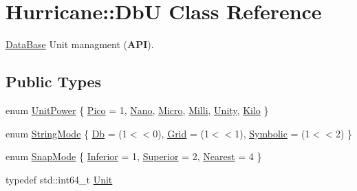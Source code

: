 \hypertarget{classHurricane_1_1DbU}{}\section{Hurricane\+:\+:DbU Class Reference}
\label{classHurricane_1_1DbU}


\hyperlink{classHurricane_1_1DataBase}{Data\+Base} Unit managment ({\bfseries A\+PI}).  


\subsection*{Public Types}
\begin{DoxyCompactItemize}
\item 
enum \hyperlink{group__DbUGroup_ga50b5785bf4d75026c4c112caec3040a7}{Unit\+Power} \{ \newline
\hyperlink{group__DbUGroup_gga50b5785bf4d75026c4c112caec3040a7a3cf34ad82faf73a9b48dcb3a621d0557}{Pico} = 1, 
\newline
\hyperlink{group__DbUGroup_gga50b5785bf4d75026c4c112caec3040a7a03e5923be5810db830626f2ca26319d6}{Nano}, 
\newline
\hyperlink{group__DbUGroup_gga50b5785bf4d75026c4c112caec3040a7aa0481a3398a6cbb0a68a523146f0a7fb}{Micro}, 
\newline
\hyperlink{group__DbUGroup_gga50b5785bf4d75026c4c112caec3040a7aac2973886c68f16ee68a192154ea65be}{Milli}, 
\newline
\hyperlink{group__DbUGroup_gga50b5785bf4d75026c4c112caec3040a7ac5c524bb7247124f3dce7d1dbdc7d2c6}{Unity}, 
\newline
\hyperlink{group__DbUGroup_gga50b5785bf4d75026c4c112caec3040a7a7853e18601786b5c51a1bc9cfaf8bb74}{Kilo}
 \}
\item 
enum \hyperlink{group__DbUGroup_ga6af6a5b8d113a661fea65b2bcb8b25c4}{String\+Mode} \{ \newline
\hyperlink{group__DbUGroup_gga6af6a5b8d113a661fea65b2bcb8b25c4a1b91af5faf467afcb73dec10bc54f233}{Db} = (1$<$$<$0), 
\newline
\hyperlink{group__DbUGroup_gga6af6a5b8d113a661fea65b2bcb8b25c4ac6b6574b2ef79ee4e44c6c00fe757c7c}{Grid} = (1$<$$<$1), 
\newline
\hyperlink{group__DbUGroup_gga6af6a5b8d113a661fea65b2bcb8b25c4a16f8df0900c42b001f0a91475a1b93f8}{Symbolic} = (1$<$$<$2)
 \}
\item 
enum \hyperlink{group__DbUGroup_ga1082168d6f9956ebba22ab8bbec21637}{Snap\+Mode} \{ \newline
\hyperlink{group__DbUGroup_gga1082168d6f9956ebba22ab8bbec21637a888eae532f84c3f19b024e1830ef8cb3}{Inferior} = 1, 
\newline
\hyperlink{group__DbUGroup_gga1082168d6f9956ebba22ab8bbec21637a8ce92cf7ff7627c46baf85612f9ad847}{Superior} = 2, 
\newline
\hyperlink{group__DbUGroup_gga1082168d6f9956ebba22ab8bbec21637a65e6f47eb16779b8974a80d6145a2db5}{Nearest} = 4
 \}
\item 
typedef std\+::int64\+\_\+t \hyperlink{group__DbUGroup_ga4fbfa3e8c89347af76c9628ea06c4146}{Unit}
\end{DoxyCompactItemize}
